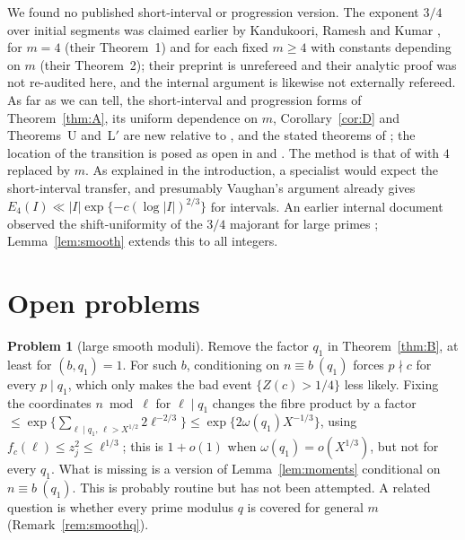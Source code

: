 \documentclass[10pt,reqno]{amsart}
\theoremstyle{definition}
\newtheorem{problem}{Problem}
\begin{document}
We found no published short-interval or progression version.  The
exponent $3/4$ over initial segments was claimed earlier by Kandukoori,
Ramesh and Kumar \cite{KRK}, for $m=4$ (their Theorem~1) and for each
fixed $m\geq4$ with constants depending on $m$ (their Theorem~2); their
preprint is unrefereed and their analytic proof was not re-audited here,
and the internal argument \cite{TQ} is likewise not externally refereed.
As far as we can tell, the short-interval and progression forms of
Theorem~\ref{thm:A}, its uniform dependence on $m$, Corollary~\ref{cor:D} and Theorems~U and~L$'$ are new
relative to \cite{PW}, \cite[Rem.~7.3]{Els} and the stated theorems of
\cite{KRK}; the location of the
transition is posed as open in \cite[p.~2]{PW} and \cite{Pom26}.  The method is that of \cite{TQ} with $4$ replaced by $m$.
As explained in the introduction, a specialist would expect the
short-interval transfer, and presumably Vaughan's argument already gives
$E_4(I)\ll|I|\exp\{-c(\log|I|)^{2/3}\}$ for intervals.  An earlier
internal document observed the shift-uniformity of the $3/4$ majorant
for large primes \cite{WEIGHTS}; Lemma~\ref{lem:smooth} extends this to
all integers.

\section{Open problems}\label{sec:open}
\begin{problem}[large smooth moduli]
Remove the factor $q_1$ in Theorem~\ref{thm:B}, at least for
$(b,q_1)=1$.  For such $b$, conditioning on $n\equiv b\ (q_1)$ forces
$p\nmid c$ for every $p\mid q_1$, which only makes the bad event
$\{Z(c)>1/4\}$ less likely.  Fixing the coordinates $n\bmod\ell$ for
$\ell\mid q_1$ changes the fibre product by a factor
$\leq\exp\{\sum_{\ell\mid q_1,\,\ell>X^{1/2}}2\ell^{-2/3}\}
\leq\exp\{2\omega(q_1)X^{-1/3}\}$, using $f_c(\ell)\leq z_j^2\leq\ell^{1/3}$;
this is $1+o(1)$ when $\omega(q_1)=o(X^{1/3})$, but not for every $q_1$.
What is missing is a
version of Lemma~\ref{lem:moments} conditional on $n\equiv b\ (q_1)$.
This is probably routine but has not been attempted.  A related question
is whether every prime modulus $q$ is covered for general $m$
(Remark~\ref{rem:smoothq}).
\end{problem}
\end{document}
